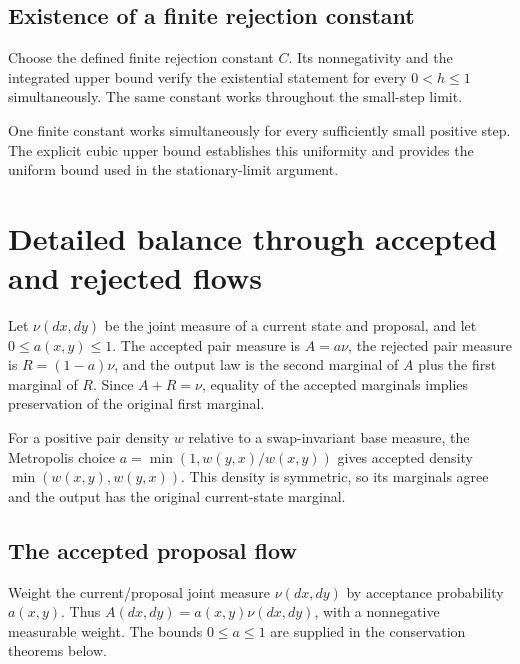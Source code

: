 \documentclass[11pt,a4paper]{article}
\begin{document}
\subsection{\texorpdfstring{Existence of a finite rejection constant}{Existence of a finite rejection constant}}


Choose the defined finite rejection constant \(C\). Its nonnegativity and the integrated upper bound verify the existential statement for every \(0<h\le1\) simultaneously. The same constant works throughout the small-step limit.



One finite constant works simultaneously for every sufficiently small positive step. The explicit cubic upper bound establishes this uniformity and provides the uniform bound used in the stationary-limit argument.


\section{\texorpdfstring{Detailed balance through accepted and rejected flows}{Detailed balance through accepted and rejected flows}}


Let \(\nu(dx,dy)\) be the joint measure of a current state and proposal, and let \(0\le a(x,y)\le1\). The accepted pair measure is \(A=a\nu\), the rejected pair measure is \(R=(1-a)\nu\), and the output law is the second marginal of \(A\) plus the first marginal of \(R\). Since \(A+R=\nu\), equality of the accepted marginals implies preservation of the original first marginal.



For a positive pair density \(w\) relative to a swap-invariant base measure, the Metropolis choice \(a=\min(1,w(y,x)/w(x,y))\) gives accepted density \(\min(w(x,y),w(y,x))\). This density is symmetric, so its marginals agree and the output has the original current-state marginal.


\subsection{\texorpdfstring{The accepted proposal flow}{The accepted proposal flow}}


Weight the current/\allowbreak{}proposal joint measure \(\nu(dx,dy)\) by acceptance probability \(a(x,y)\). Thus \(A(dx,dy)=a(x,y)\nu(dx,dy)\), with a nonnegative measurable weight. The bounds \(0\le a\le1\) are supplied in the conservation theorems below.
\end{document}
